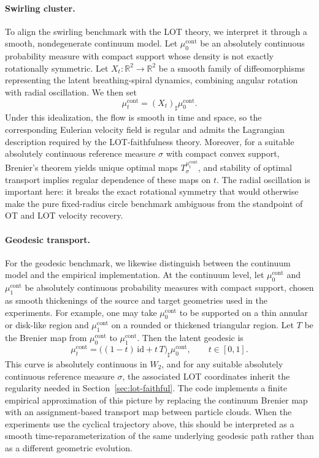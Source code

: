 \documentclass[11pt]{article}
\newcommand{\R}{\mathbb{R}}
\newcommand{\1}{\mathbf{1}}
\begin{document}
\paragraph{Swirling cluster.}
To align the swirling benchmark with the LOT theory, we interpret it through a smooth, nondegenerate continuum model. Let \(\mu_0^{\mathrm{cont}}\) be an absolutely continuous probability measure with compact support whose density is not exactly rotationally symmetric. Let \(X_t:\R^2\to\R^2\) be a smooth family of diffeomorphisms representing the latent breathing-spiral dynamics, combining angular rotation with radial oscillation. We then set
\[
\mu_t^{\mathrm{cont}}=(X_t)_\sharp \mu_0^{\mathrm{cont}}.
\]
Under this idealization, the flow is smooth in time and space, so the corresponding Eulerian velocity field is regular and admits the Lagrangian description required by the LOT-faithfulness theory. Moreover, for a suitable absolutely continuous reference measure \(\sigma\) with compact convex support, Brenier's theorem yields unique optimal maps \(T_\sigma^{\mu_t^{\mathrm{cont}}}\), and stability of optimal transport implies regular dependence of these maps on \(t\). The radial oscillation is important here: it breaks the exact rotational symmetry that would otherwise make the pure fixed-radius circle benchmark ambiguous from the standpoint of OT and LOT velocity recovery.

\paragraph{Geodesic transport.}
For the geodesic benchmark, we likewise distinguish between the continuum model and the empirical implementation. At the continuum level, let \(\mu_0^{\mathrm{cont}}\) and \(\mu_1^{\mathrm{cont}}\) be absolutely continuous probability measures with compact support, chosen as smooth thickenings of the source and target geometries used in the experiments. For example, one may take \(\mu_0^{\mathrm{cont}}\) to be supported on a thin annular or disk-like region and \(\mu_1^{\mathrm{cont}}\) on a rounded or thickened triangular region. Let \(T\) be the Brenier map from \(\mu_0^{\mathrm{cont}}\) to \(\mu_1^{\mathrm{cont}}\). Then the latent geodesic is
\[
\mu_t^{\mathrm{cont}}=\bigl((1-t)\,\mathrm{id}+t\,T\bigr)_\sharp \mu_0^{\mathrm{cont}},\qquad t\in[0,1].
\]
This curve is absolutely continuous in \(W_2\), and for any suitable absolutely continuous reference measure \(\sigma\), the associated LOT coordinates inherit the regularity needed in Section~\ref{sec:lot-faithful}. The code implements a finite empirical approximation of this picture by replacing the continuum Brenier map with an assignment-based transport map between particle clouds. When the experiments use the cyclical trajectory above, this should be interpreted as a smooth time-reparameterization of the same underlying geodesic path rather than as a different geometric evolution.
\end{document}
